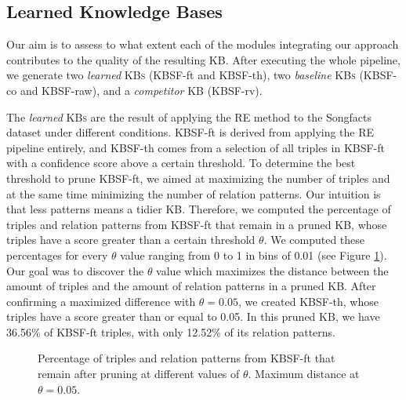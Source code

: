 \subsection{Learned Knowledge Bases}
\label{sec:kb:exp:learnedkbs}

Our aim is to assess to what extent each of the modules integrating our approach contributes to the quality of the resulting \textsc{KB}. After executing the whole pipeline, we generate two \textit{learned} \textsc{KBs} (\textsc{KBSF}-ft and \textsc{KBSF}-th), two \textit{baseline} \textsc{KBs} (\textsc{KBSF}-co and \textsc{KBSF}-raw), and a \textit{competitor} \textsc{KB} (\textsc{KBSF}-rv). 

The \textit{learned} \textsc{KBs} are the result of applying the \textsc{RE} method to the Songfacts dataset under different conditions. \textsc{KBSF}-ft is derived from applying the \textsc{RE} pipeline entirely, and \textsc{KBSF}-th comes from a selection of all triples in \textsc{KBSF}-ft with a confidence score above a certain threshold. To determine the best threshold to prune \textsc{KBSF}-ft, we aimed at maximizing the number of triples and at the same time minimizing the number of relation patterns. Our intuition is that less patterns means a tidier \textsc{KB}. Therefore, we computed the percentage of triples and relation patterns from \textsc{KBSF}-ft that remain in a pruned \textsc{KB}, whose triples have a score greater than a certain threshold $\theta$. We computed these percentages for every $\theta$ value ranging from 0 to 1 in bins of 0.01 (see Figure \ref{fig:kb:th}). Our goal was to discover the $\theta$ value which maximizes the distance between the amount of triples and the amount of relation patterns in a pruned \textsc{KB}. After confirming a maximized difference with $\theta=0.05$, we created \textsc{KBSF}-th, whose triples have a score greater than or equal to 0.05. In this pruned \textsc{KB}, we have 36.56\% of \textsc{KBSF}-ft triples, with only 12.52\% of its relation patterns.

\begin{figure}[!htp]
\centerline{}
\caption{Percentage of triples and relation patterns from \textsc{KBSF}-ft that remain after pruning at different values of $\theta$. Maximum distance at $\theta=0.05$.}
\label{fig:kb:th}
\end{figure}

